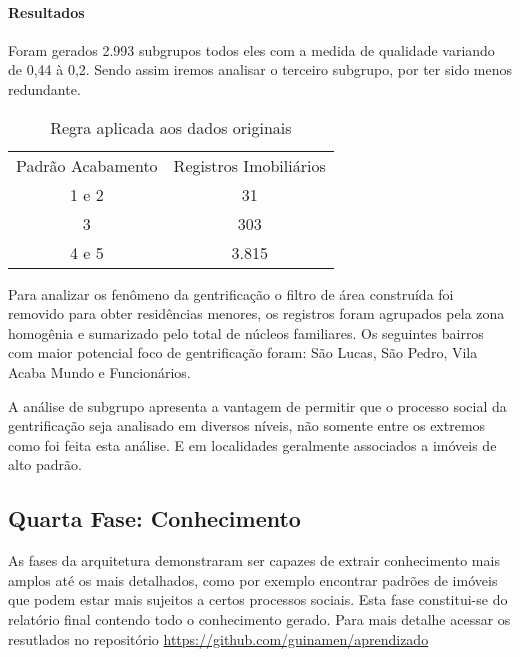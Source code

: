 \documentclass[12pt]{article}
\begin{document}
\paragraph{Resultados}
Foram gerados 2.993 subgrupos todos eles com a medida de qualidade variando de 0,44 à 0,2. Sendo assim iremos analisar o terceiro subgrupo, por ter sido menos redundante.

\begin{table}[ht]
\centering
\label{table:sub}
\caption{Subgrupo escolhido}
\end{table}

\begin{table}[!htbp]
\centering
\label{table:sub-aca}
\begin{tabular}{cc}
 Padrão Acabamento & Registros Imobiliários  \\
 1 e 2 & 31 \\
 3 & 303 \\
 4 e 5 & 3.815 \\
\end{tabular}
\caption{Regra aplicada aos dados originais}
\end{table}

Para analizar os fenômeno da gentrificação o filtro de área construída foi removido para obter residências menores, os registros foram agrupados pela zona homogênia e sumarizado pelo total de núcleos familiares. Os seguintes bairros com maior potencial foco de gentrificação foram: São Lucas, São Pedro, Vila Acaba Mundo e Funcionários.

A análise de subgrupo apresenta a vantagem de permitir que o processo social da gentrificação seja analisado em diversos níveis, não somente entre os extremos como foi feita esta análise. E em localidades geralmente associados a imóveis de alto padrão.

\subsection{Quarta Fase: Conhecimento}
As fases da arquitetura demonstraram ser capazes de extrair conhecimento mais amplos até os mais detalhados, como por exemplo encontrar padrões de imóveis que podem estar mais sujeitos a certos processos sociais. Esta fase constitui-se do relatório final contendo todo o conhecimento gerado. Para mais detalhe acessar os resutlados no repositório \href{https://github.com/guinamen/aprendizado}{https://github.com/guinamen/aprendizado}
\end{document}
